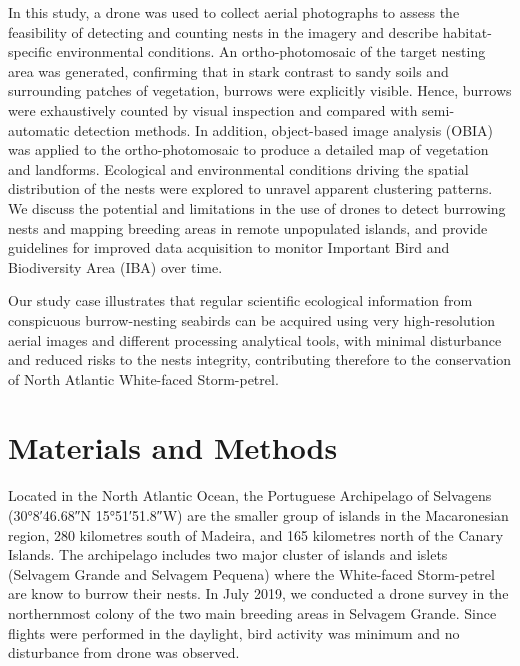 \documentclass[12pt]{article}
\begin{document}
In this study, a drone was used to collect aerial photographs to assess the feasibility of detecting and counting nests in the imagery and describe habitat-specific environmental conditions. An ortho-photomosaic of the target nesting area was generated, confirming that in stark contrast to sandy soils and surrounding patches of vegetation, burrows were explicitly visible. Hence, burrows were exhaustively counted by visual inspection and compared with semi-automatic detection methods. In addition, object-based image analysis (OBIA) was applied to the ortho-photomosaic to produce a detailed map of vegetation and landforms. Ecological and environmental conditions driving the spatial distribution of the nests were explored to unravel apparent clustering patterns. We discuss the potential and limitations in the use of drones to detect burrowing nests and mapping breeding areas in remote unpopulated islands, and provide guidelines for improved data acquisition to monitor Important Bird and Biodiversity Area (IBA) over time. 

Our study case illustrates that regular scientific ecological information from conspicuous burrow-nesting seabirds can be acquired using very high-resolution aerial images and different processing analytical tools, with minimal disturbance and reduced risks to the nests integrity, contributing therefore to the conservation of North Atlantic White-faced Storm-petrel.

\section{Materials and Methods}

Located in the North Atlantic Ocean, the Portuguese Archipelago of Selvagens (\ang{30;8;46.68}N \ang{15;51;51.8}W) are the smaller group of islands in the Macaronesian region, 280 kilometres  south of Madeira, and 165 kilometres north of  the Canary Islands. The archipelago includes two major cluster of islands and islets (Selvagem Grande and Selvagem Pequena) where the White-faced Storm-petrel are know to burrow their nests. In July 2019, we conducted a drone survey in the northernmost colony of the two main breeding areas in Selvagem Grande.  Since flights were performed in the daylight, bird activity was minimum and no disturbance from drone was observed.




\end{document}
